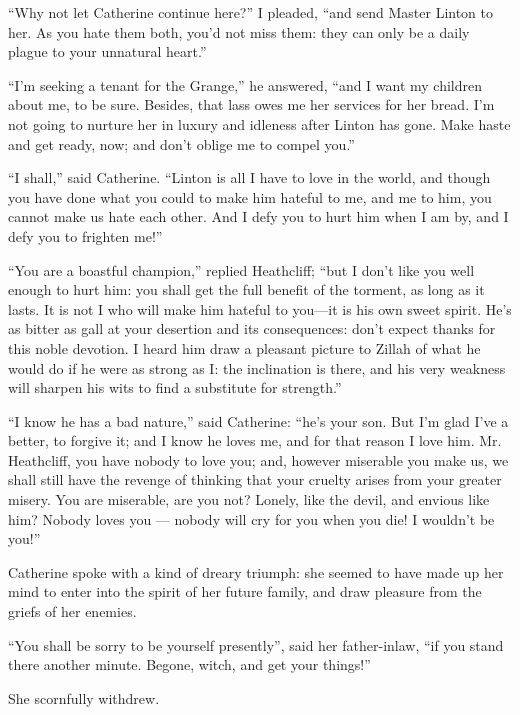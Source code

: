 \par “Why not let Catherine continue here?” I pleaded, “and send Master Linton to her. As you hate them both, you'd not miss them: they can only be a daily plague to your unnatural heart.”
\par “I'm seeking a tenant for the Grange,” he answered, “and I want my children about me, to be sure. Besides, that lass owes me her services for her bread. I'm not going to nurture her in luxury and idleness after Linton has gone. Make haste and get ready, now; and don't oblige me to compel you.”
\par “I shall,” said Catherine. “Linton is all I have to love in the world, and though you have done what you could to make him hateful to me, and me to him, you cannot make us hate each other. And I defy you to hurt him when I am by, and I defy you to frighten me!”
\par “You are a boastful champion,” replied Heathcliff; “but I don't like you well enough to hurt him: you shall get the full benefit of the torment, as long as it lasts. It is not I who will make him hateful to you—it is his own sweet spirit. He's as bitter as gall at your desertion and its consequences: don't expect thanks for this noble devotion. I heard him draw a pleasant picture to Zillah of what he would do if he were as strong as I: the inclination is there, and his very weakness will sharpen his wits to find a substitute for strength.”
\par “I know he has a bad nature,” said Catherine: “he's your son. But I'm glad I've a better, to forgive it; and I know he loves me, and for that reason I love him. Mr. Heathcliff, you have nobody to love you; and, however miserable you make us, we shall still have the revenge of thinking that your cruelty arises from your greater misery. You are miserable, are you not? Lonely, like the devil, and envious like him? Nobody loves you — nobody will cry for you when you die! I wouldn't be you!”
\par Catherine spoke with a kind of dreary triumph: she seemed to have made up her mind to enter into the spirit of her future family, and draw pleasure from the griefs of her enemies.
\par “You shall be sorry to be yourself presently”, said her father-inlaw, “if you stand there another minute. Begone, witch, and get your things!”
\par She scornfully withdrew.
